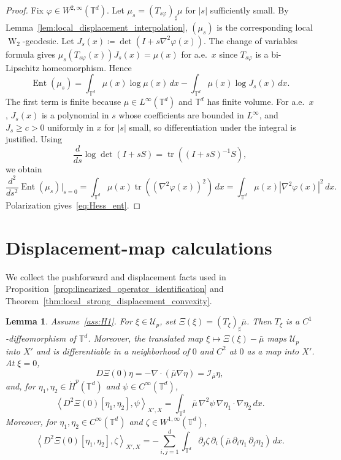 \documentclass[11pt]{article}
\numberwithin{equation}{section}
\newtheorem{lemma}[theorem]{Lemma}
\theoremstyle{definition}
\newcommand{\T}{\mathbb{T}}
\newcommand{\Wtwo}{\operatorname{W}_2}
\newcommand{\Ent}{\operatorname{Ent}}
\newcommand{\rieszmap}[1][\mu]{\mathcal{I}_{#1}}
\newcommand{\dotHk}[1][k]{\dot{H}^{#1}}
\begin{document}
\begin{proof}
    Fix $\varphi \in W^{2,\infty}(\T^d)$.
    Let $\mu_s = (T_{s\varphi})_{\sharp}\mu$ for $|s|$ sufficiently small.
    By Lemma~\ref{lem:local_displacement_interpolation}, $(\mu_s)$ is the corresponding local $\Wtwo$-geodesic.
    Let $J_s(x) \coloneqq \det(I + s \nabla^2\varphi(x))$.
    The change of variables formula gives $\mu_s(T_{s\varphi}(x)) J_s(x) = \mu(x)$ for a.e.\ $x$ since $T_{s\varphi}$ is a bi-Lipschitz homeomorphism.
    Hence
    \[
    \Ent(\mu_s) = \int_{\T^d} \mu(x)\log\mu(x) \, dx - \int_{\T^d} \mu(x) \log J_s(x) \, dx.
    \]
    The first term is finite because $\mu \in L^\infty(\T^d)$ and $\T^d$ has finite volume.
    For a.e.\ $x$, $J_s(x)$ is a polynomial in $s$ whose coefficients are bounded in $L^\infty$, and $J_s \ge c > 0$ uniformly in $x$ for $|s|$ small, so differentiation under the integral is justified.
    Using
    \[
    \frac{d}{ds} \log\det(I+sS) = \operatorname{tr}((I+sS)^{-1}S),
    \]
    we obtain
    \[
    \frac{d^2}{ds^2}\Ent(\mu_s) \Big|_{s=0} = \int_{\T^d}\mu(x)\operatorname{tr}((\nabla^2\varphi(x))^2)\,dx = \int_{\T^d} \mu(x) |\nabla^2\varphi(x)|^2 \, dx.
    \]
    Polarization gives~\eqref{eq:Hess_ent}.
\end{proof}

\section{Displacement-map calculations}
\label{app:displacement-map}

We collect the pushforward and displacement facts used in Proposition~\ref{prop:linearized_operator_identification} and Theorem~\ref{thm:local_strong_displacement_convexity}.

\begin{lemma}
    \label{lem:pushforward_map}
    Assume~\ref{ass:H1}.
    For $\xi \in \mathcal{U}_p$, set $\Xi(\xi) = (T_\xi)_{\sharp}\bar\mu$.
    Then $T_\xi$ is a $C^1$-diffeomorphism of $\T^d$.
    Moreover, the translated map $\xi \mapsto \Xi(\xi)-\bar\mu$ maps $\mathcal{U}_p$ into $X'$ and is differentiable in a neighborhood of $0$ and $C^2$ at $0$ as a map into $X'$.
    At $\xi = 0$,
    \[
    D\Xi(0)\eta = -\nabla \cdot (\bar\mu \nabla\eta) = \rieszmap[\bar\mu]\eta,
    \]
    and, for $\eta_1, \eta_2 \in \dotHk[p](\T^d)$ and $\psi \in C^{\infty}(\T^d)$,
    \[
    \left\langle D^2\Xi(0)[\eta_1,\eta_2],\psi\right\rangle_{X',X} = \int_{\T^d}\bar\mu\,\nabla^2\psi\,\nabla\eta_1\cdot\nabla\eta_2\,dx.
    \]
    Moreover, for $\eta_1, \eta_2 \in C^\infty(\T^d)$ and $\zeta \in W^{1,\infty}(\T^d)$,
    \[
    \left\langle D^2\Xi(0)[\eta_1,\eta_2],\zeta\right\rangle_{X',X} = -\sum_{i,j=1}^d\int_{\T^d}\partial_j\zeta\,\partial_i(\bar\mu \,\partial_i\eta_1\,\partial_j\eta_2) \, dx.
    \]
\end{lemma}
\end{document}
